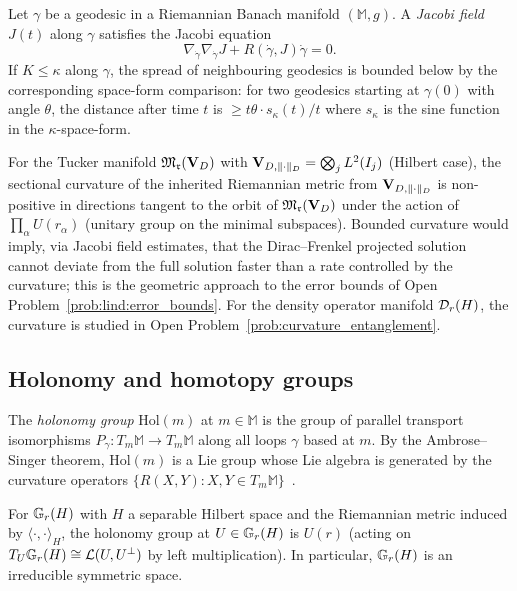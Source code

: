 \begin{proposition}
\label{prop:app:jacobi}
Let $\gamma$ be a geodesic in a Riemannian Banach manifold $(\mathbb{M},g)$.
A \emph{Jacobi field} $J(t)$ along $\gamma$ satisfies the Jacobi
equation
\begin{equation}
    \nabla_{\dot\gamma}\nabla_{\dot\gamma} J
    + R(\dot\gamma, J)\dot\gamma = 0.
\end{equation}
If $K \leq \kappa$ along $\gamma$, the spread of neighbouring geodesics
is bounded below by the corresponding space-form comparison: for two
geodesics starting at $\gamma(0)$ with angle $\theta$, the distance
after time $t$ is $\geq t\theta \cdot s_\kappa(t)/t$ where $s_\kappa$
is the sine function in the $\kappa$-space-form.
\end{proposition}

\begin{remark}
\label{rem:app:curvature_DF}
For the Tucker manifold $\mathfrak{M}_{\mathfrak{r}}(\mathbf{V}_D)$ with $\mathbf{V}_{D,\|\cdot\|_D} =
\bigotimes_j L^2(I_j)$ (Hilbert case), the sectional curvature of the
inherited Riemannian metric from $\mathbf{V}_{D,\|\cdot\|_D}$ is non-positive in directions
tangent to the orbit of $\mathfrak{M}_{\mathfrak{r}}(\mathbf{V}_D)$ under the action of
$\prod_\alpha U(r_\alpha)$ (unitary group on the minimal subspaces).
Bounded curvature would imply, via Jacobi field estimates, that the
Dirac--Frenkel projected solution cannot deviate from the full solution
faster than a rate controlled by the curvature; this is the geometric
approach to the error bounds of Open Problem~\ref{prob:lind:error_bounds}.
For the density operator manifold $\mathcal{D}_{r}(H)$, the curvature is
studied in Open Problem~\ref{prob:curvature_entanglement}.
\end{remark}

\subsection*{Holonomy and homotopy groups}

The \emph{holonomy group} $\mathrm{Hol}(m)$ at $m \in \mathbb{M}$ is the
group of parallel transport isomorphisms $P_\gamma: T_m\mathbb{M} \to
T_m\mathbb{M}$ along all loops $\gamma$ based at $m$. By the
Ambrose--Singer theorem, $\mathrm{Hol}(m)$ is a Lie group whose Lie
algebra is generated by the curvature operators $\{R(X,Y) : X, Y \in
T_m\mathbb{M}\}$~\cite{AbrahamMarsdenRatiu1988}.

\begin{proposition}
\label{prop:app:holonomy_grassmann}
For $\mathbb{G}_{r}(H)$ with $H$ a separable Hilbert space and the Riemannian
metric induced by $\langle \cdot, \cdot\rangle_H$, the holonomy group
at $U \in \mathbb{G}_{r}(H)$ is $U(r)$ (acting on $T_U\mathbb{G}_{r}(H) \cong
\mathcal{L}(U, U^\perp)$ by left multiplication). In particular,
$\mathbb{G}_{r}(H)$ is an irreducible symmetric space.
\end{proposition}

